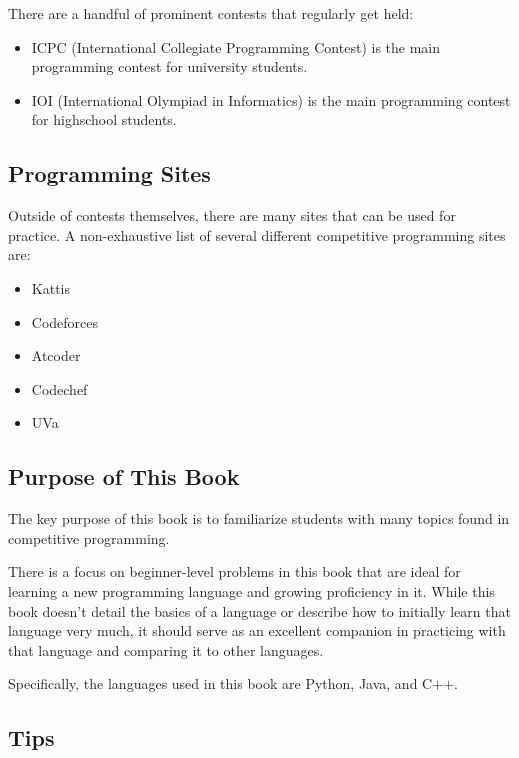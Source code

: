 There are a handful of prominent contests that regularly get held:

\begin{itemize}
\item ICPC  (International Collegiate Programming Contest) is the main programming contest for university students.
\item IOI  (International Olympiad in Informatics) is the main programming contest for highschool students.
\end{itemize}

\subsection{Programming Sites}

Outside of contests themselves, there are many sites that can be used for practice. A non-exhaustive list of several different competitive programming sites are:

\begin{itemize}
\item Kattis 
\item Codeforces 
\item Atcoder 
\item Codechef 
\item UVa 
\end{itemize}

\subsection{Purpose of This Book}

The key purpose of this book is to familiarize students with many topics found in competitive programming.

There is a focus on beginner-level problems in this book that are ideal for learning a new programming language and growing proficiency in it. While this book doesn't detail the basics of a language or describe how to initially learn that language very much, it should serve as an excellent companion in practicing with that language and comparing it to other languages.

Specifically, the languages used in this book are Python, Java, and C++.

\subsection{Tips}

